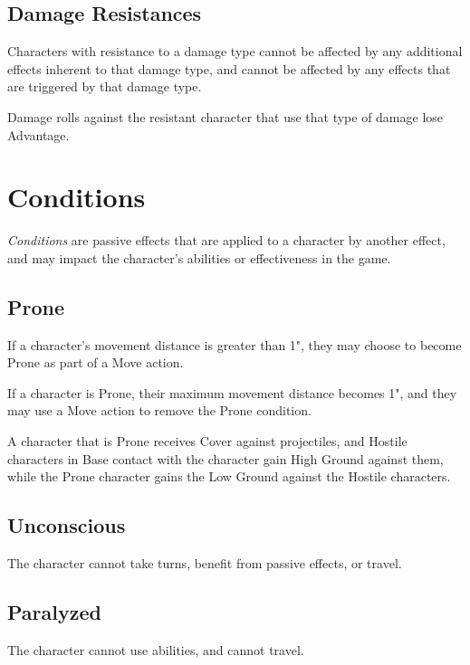 \subsection{Damage Resistances}
Characters with resistance to a damage type cannot be affected by any additional effects 
inherent to that damage type,
and cannot be affected by any effects that are triggered by that damage type.

\vspace{0.4em}

Damage rolls against the resistant character that use that type of damage lose Advantage.



\section{Conditions}
\textit{Conditions} are passive effects that are applied to a character by another effect,
and may impact the character's abilities or effectiveness in the game.

\subsection{Prone}
If a character's movement distance is greater than 1", 
they may choose to become Prone as part of a Move action.

\vspace{0.4em}

If a character is Prone, their maximum movement distance becomes 1",
and they may use a Move action to remove the Prone condition.

\vspace{0.4em}

A character that is Prone receives Cover against projectiles,
and Hostile characters in Base contact with the character gain High Ground against them,
while the Prone character gains the Low Ground against the Hostile characters.

\subsection{Unconscious}
The character cannot take turns, benefit from passive effects, or travel.

\subsection{Paralyzed}
The character cannot use abilities, and cannot travel.


